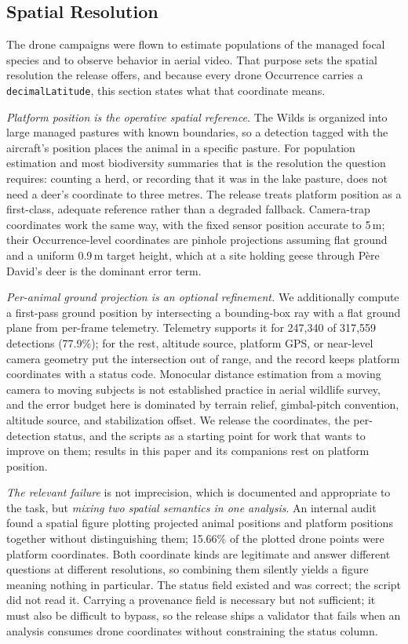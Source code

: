 \documentclass[sigconf]{acmart}
\begin{document}
\subsection{Spatial Resolution}
\label{sec:scope}

The drone campaigns were flown to estimate populations of the managed
focal species and to observe behavior in aerial video. That purpose
sets the spatial resolution the release offers, and because every drone
Occurrence carries a \texttt{decimalLatitude}, this section states what
that coordinate means.

\emph{Platform position is the operative spatial reference.} The Wilds is organized into large managed pastures with known
boundaries, so a detection tagged with the aircraft's position places
the animal in a specific pasture. For population estimation and most
biodiversity summaries that is the resolution the question requires:
counting a herd, or recording that it was in the lake pasture, does not
need a deer's coordinate to three metres. The release treats platform
position as a first-class, adequate reference rather than a degraded
fallback. Camera-trap coordinates work the same way, with the fixed
sensor position accurate to 5\,m; their Occurrence-level coordinates are
pinhole projections assuming flat ground and a uniform 0.9\,m target
height, which at a site holding geese through Père David's deer is the
dominant error term.

\emph{Per-animal ground projection is an optional refinement.} We
additionally compute a first-pass ground position by intersecting a
bounding-box ray with a flat ground plane from per-frame telemetry.
Telemetry supports it for 247{,}340 of 317{,}559 detections (77.9\%);
for the rest, altitude source, platform GPS, or near-level camera
geometry put the intersection out of range, and the record keeps
platform coordinates with a status code. Monocular distance estimation
from a moving camera to moving subjects is not established practice in
aerial wildlife survey, and the error budget here is dominated by
terrain relief, gimbal-pitch convention, altitude source, and
stabilization offset. We release the coordinates, the per-detection
status, and the scripts as a starting point for work that wants to
improve on them; results in this paper and its companions rest on
platform position.

\emph{The relevant failure} is not imprecision, which is documented and
appropriate to the task, but \emph{mixing two spatial semantics in one
analysis}. An internal audit found a spatial figure plotting projected
animal positions and platform positions together without distinguishing
them; 15.66\% of the plotted drone points were platform coordinates.
Both coordinate kinds are legitimate and answer different questions at
different resolutions, so combining them silently yields a figure
meaning nothing in particular. The status field existed and was correct;
the script did not read it. Carrying a provenance field is necessary but
not sufficient; it must also be difficult to bypass, so the release
ships a validator that fails when an analysis consumes drone coordinates
without constraining the status column.
\end{document}
